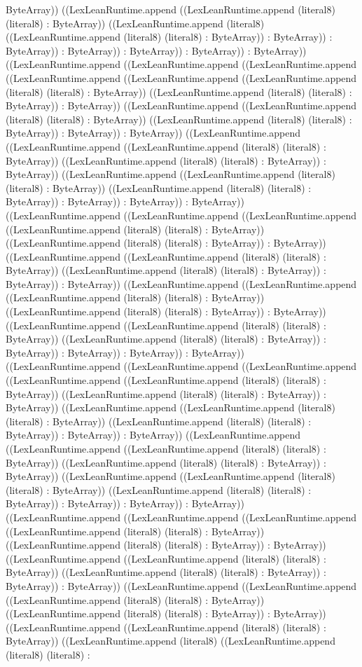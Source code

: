 \documentclass[11pt]{article}
\begin{document}
ByteArray)) ((LexLeanRuntime.append ((LexLeanRuntime.append (literal8) (literal8) : ByteArray)) ((LexLeanRuntime.append (literal8) ((LexLeanRuntime.append (literal8) (literal8) : ByteArray)) : ByteArray)) : ByteArray)) : ByteArray)) : ByteArray)) : ByteArray)) : ByteArray)) ((LexLeanRuntime.append ((LexLeanRuntime.append ((LexLeanRuntime.append ((LexLeanRuntime.append ((LexLeanRuntime.append ((LexLeanRuntime.append (literal8) (literal8) : ByteArray)) ((LexLeanRuntime.append (literal8) (literal8) : ByteArray)) : ByteArray)) ((LexLeanRuntime.append ((LexLeanRuntime.append (literal8) (literal8) : ByteArray)) ((LexLeanRuntime.append (literal8) (literal8) : ByteArray)) : ByteArray)) : ByteArray)) ((LexLeanRuntime.append ((LexLeanRuntime.append ((LexLeanRuntime.append (literal8) (literal8) : ByteArray)) ((LexLeanRuntime.append (literal8) (literal8) : ByteArray)) : ByteArray)) ((LexLeanRuntime.append ((LexLeanRuntime.append (literal8) (literal8) : ByteArray)) ((LexLeanRuntime.append (literal8) (literal8) : ByteArray)) : ByteArray)) : ByteArray)) : ByteArray)) ((LexLeanRuntime.append ((LexLeanRuntime.append ((LexLeanRuntime.append ((LexLeanRuntime.append (literal8) (literal8) : ByteArray)) ((LexLeanRuntime.append (literal8) (literal8) : ByteArray)) : ByteArray)) ((LexLeanRuntime.append ((LexLeanRuntime.append (literal8) (literal8) : ByteArray)) ((LexLeanRuntime.append (literal8) (literal8) : ByteArray)) : ByteArray)) : ByteArray)) ((LexLeanRuntime.append ((LexLeanRuntime.append ((LexLeanRuntime.append (literal8) (literal8) : ByteArray)) ((LexLeanRuntime.append (literal8) (literal8) : ByteArray)) : ByteArray)) ((LexLeanRuntime.append ((LexLeanRuntime.append (literal8) (literal8) : ByteArray)) ((LexLeanRuntime.append (literal8) (literal8) : ByteArray)) : ByteArray)) : ByteArray)) : ByteArray)) : ByteArray)) ((LexLeanRuntime.append ((LexLeanRuntime.append ((LexLeanRuntime.append ((LexLeanRuntime.append ((LexLeanRuntime.append (literal8) (literal8) : ByteArray)) ((LexLeanRuntime.append (literal8) (literal8) : ByteArray)) : ByteArray)) ((LexLeanRuntime.append ((LexLeanRuntime.append (literal8) (literal8) : ByteArray)) ((LexLeanRuntime.append (literal8) (literal8) : ByteArray)) : ByteArray)) : ByteArray)) ((LexLeanRuntime.append ((LexLeanRuntime.append ((LexLeanRuntime.append (literal8) (literal8) : ByteArray)) ((LexLeanRuntime.append (literal8) (literal8) : ByteArray)) : ByteArray)) ((LexLeanRuntime.append ((LexLeanRuntime.append (literal8) (literal8) : ByteArray)) ((LexLeanRuntime.append (literal8) (literal8) : ByteArray)) : ByteArray)) : ByteArray)) : ByteArray)) ((LexLeanRuntime.append ((LexLeanRuntime.append ((LexLeanRuntime.append ((LexLeanRuntime.append (literal8) (literal8) : ByteArray)) ((LexLeanRuntime.append (literal8) (literal8) : ByteArray)) : ByteArray)) ((LexLeanRuntime.append ((LexLeanRuntime.append (literal8) (literal8) : ByteArray)) ((LexLeanRuntime.append (literal8) (literal8) : ByteArray)) : ByteArray)) : ByteArray)) ((LexLeanRuntime.append ((LexLeanRuntime.append ((LexLeanRuntime.append (literal8) (literal8) : ByteArray)) ((LexLeanRuntime.append (literal8) (literal8) : ByteArray)) : ByteArray)) ((LexLeanRuntime.append ((LexLeanRuntime.append (literal8) (literal8) : ByteArray)) ((LexLeanRuntime.append (literal8) ((LexLeanRuntime.append (literal8) (literal8) : 
\end{document}
